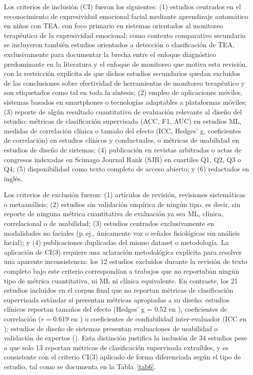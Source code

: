 \documentclass[ASNA,twocolumn]{USG}
\begin{document}
	Los criterios de inclusión (CI) fueron los siguientes: (1) estudios centrados en
	el reconocimiento de expresividad emocional facial mediante aprendizaje automático
	en niños con TEA, con foco primario en sistemas orientados al monitoreo
	terapéutico de la expresividad emocional; como contexto comparativo secundario se
	incluyeron también estudios orientados a detección o clasificación de TEA,
	exclusivamente para documentar la brecha entre el enfoque diagnóstico predominante
	en la literatura y el enfoque de monitoreo que motiva esta revisión, con la
	restricción explícita de que dichos estudios secundarios quedan excluidos de las
	conclusiones sobre efectividad de herramientas de monitoreo terapéutico y son
	etiquetados como tal en toda la síntesis; (2) empleo de aplicaciones móviles,
	sistemas basados en smartphones o tecnologías adaptables a plataformas móviles;
	(3) reporte de algún resultado cuantitativo de evaluación relevante al diseño del
	estudio: métricas de clasificación supervisada (ACC, F1, AUC) en estudios ML,
	medidas de correlación clínica o tamaño del efecto (ICC, Hedges' g, coeficientes
	de correlación) en estudios clínicos y conductuales, o métricas de usabilidad en
	estudios de diseño de sistemas; (4) publicación en revistas arbitradas o actas de
	congresos indexadas en Scimago Journal Rank (SJR) en cuartiles Q1, Q2, Q3 o Q4;
	(5) disponibilidad como texto completo de acceso abierto; y (6) redactados en
	inglés.
	
	Los criterios de exclusión fueron: (1) artículos de revisión, revisiones
	sistemáticas o metaanálisis; (2) estudios sin validación empírica de ningún tipo,
	es decir, sin reporte de ninguna métrica cuantitativa de evaluación ya sea ML,
	clínica, correlacional o de usabilidad; (3) estudios centrados exclusivamente en
	modalidades no faciales (p.\,ej., únicamente voz o señales fisiológicas sin
	análisis facial); y (4) publicaciones duplicadas del mismo dataset o metodología.
	La aplicación de CI(3) requiere una aclaración metodológica explícita para
	resolver una aparente inconsistencia: los 12 estudios excluidos durante la
	revisión de texto completo bajo este criterio correspondían a trabajos que no
	reportaban ningún tipo de métrica cuantitativa, ni ML ni clínica equivalente. En
	contraste, los 21 estudios incluidos en el corpus final que no reportan métricas
	de clasificación supervisada estándar sí presentan métricas apropiadas a su
	diseño: estudios clínicos reportan tamaños del efecto (Hedges' g = 0.52 en
	\cite{Lecciso2021}), coeficientes de correlación ($r = 0.619$ en \cite{He2019}) o
	coeficientes de confiabilidad inter-evaluador (ICC en \cite{Rudovic2018,Rudovic2019});
	estudios de diseño de sistemas presentan evaluaciones de usabilidad o validación
	de expertos (\cite{Levy2024,Almeida2019}). Esta distinción justifica la inclusión de
	34 estudios pese a que solo 13 reportan métricas de clasificación supervisada
	extraíbles, y es consistente con el criterio CI(3) aplicado de forma diferenciada
	según el tipo de estudio, tal como se documenta en la Tabla~\ref{tab6}.
	
\end{document}
